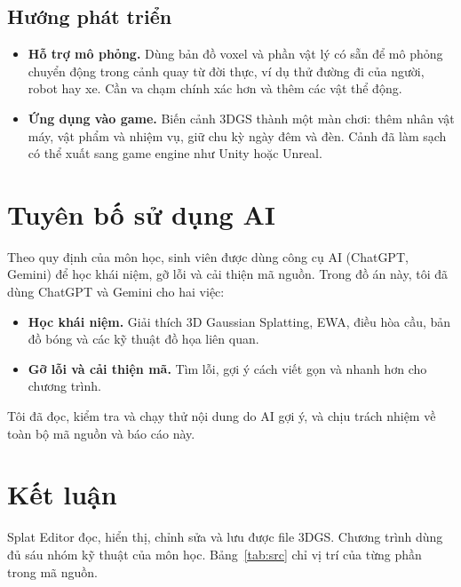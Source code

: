 \documentclass[9pt,twocolumn,a4paper]{extarticle}
\begin{document}
\subsection{Hướng phát triển}
\begin{itemize}\itemsep0pt
\item \textbf{Hỗ trợ mô phỏng.} Dùng bản đồ voxel và phần vật lý có sẵn để mô phỏng chuyển động trong cảnh quay từ đời thực, ví dụ thử đường đi của người, robot hay xe. Cần va chạm chính xác hơn và thêm các vật thể động.
\item \textbf{Ứng dụng vào game.} Biến cảnh 3DGS thành một màn chơi: thêm nhân vật máy, vật phẩm và nhiệm vụ, giữ chu kỳ ngày đêm và đèn. Cảnh đã làm sạch có thể xuất sang game engine như Unity hoặc Unreal.
\end{itemize}

\section{Tuyên bố sử dụng AI}
\label{chap:ai}
Theo quy định của môn học, sinh viên được dùng công cụ AI (ChatGPT, Gemini) để học khái niệm, gỡ lỗi và cải thiện mã nguồn. Trong đồ án này, tôi đã dùng ChatGPT và Gemini cho hai việc:
\begin{itemize}\itemsep0pt
\item \textbf{Học khái niệm.} Giải thích 3D Gaussian Splatting, EWA, điều hòa cầu, bản đồ bóng và các kỹ thuật đồ họa liên quan.
\item \textbf{Gỡ lỗi và cải thiện mã.} Tìm lỗi, gợi ý cách viết gọn và nhanh hơn cho chương trình.
\end{itemize}
Tôi đã đọc, kiểm tra và chạy thử nội dung do AI gợi ý, và chịu trách nhiệm về toàn bộ mã nguồn và báo cáo này.

\section{Kết luận}
\label{chap:end}
Splat Editor đọc, hiển thị, chỉnh sửa và lưu được file 3DGS. Chương trình dùng đủ sáu nhóm kỹ thuật của môn học. Bảng~\ref{tab:src} chỉ vị trí của từng phần trong mã nguồn.
\end{document}
